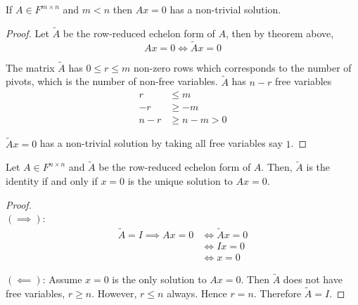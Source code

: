 \begin{corollary}
If $A \in F^{m \times n}$ and $m < n$ then $Ax = 0$ has a non-trivial solution.
\end{corollary} 

\begin{proof}
Let $\tilde{A}$ be the row-reduced echelon form of $A$, then by theorem above, 
\[
  Ax = 0 \iff \tilde{A} x = 0
\]

The matrix $\tilde{A}$  has $0 \leq r \leq m$ non-zero rows which corresponds to the number of pivots, which is the number of non-free variables.  $\tilde{A}$ has $n - r$ free variables 
\begin{align*}
    r & \leq m \\
    -r & \geq -m \\
    n - r & \geq n - m > 0
\end{align*}

$\tilde{A}x = 0$ has a non-trivial solution by taking all free variables say $1$.
\end{proof}


\begin{corollary}
Let $A \in F^{n \times n}$ and $\tilde{A}$ be the row-reduced echelon form of $A$. Then, $\tilde{A}$ is the identity if and only if $x = 0$ is the unique solution to $Ax = 0$. 
\end{corollary} 


\begin{proof} 
\\
$(\implies)$:
\begin{align*}
    \tilde{A} = I \implies Ax = 0 & \iff \tilde{A}x = 0 \\
    & \iff Ix = 0 \\
    & \iff x = 0
\end{align*}

$(\impliedby)$: Assume $x = 0$ is the only solution to $Ax = 0$. Then $\tilde{A}$ does not have free variables, $r \geq n$. However, $r \leq n$ always. Hence $r = n$. Therefore $\tilde{A} = I$.
\end{proof}

\newpage